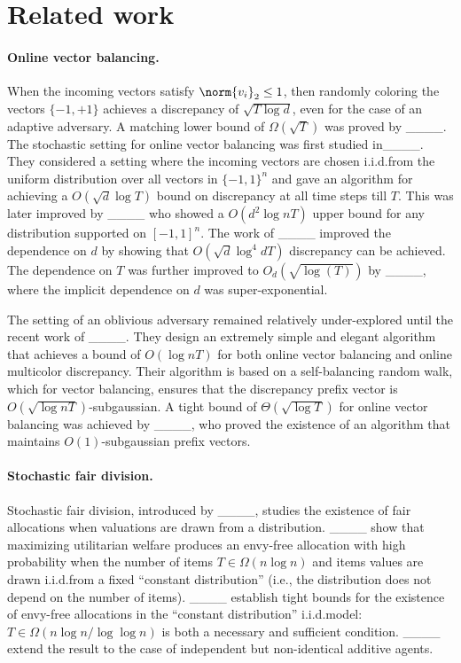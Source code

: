 \section{Related work}
\paragraph{Online vector balancing.}
    When the incoming vectors satisfy $\norm{v_i}_2 \leq 1$, then randomly coloring the vectors $\{-1,+1\}$ achieves a discrepancy of $\sqrt{T \log{d}}$, even for the case of an adaptive adversary. A  matching lower bound of $\Omega(\sqrt{T})$ was proved by ____. The stochastic setting for online vector balancing was first studied in____. They considered a setting where the incoming vectors are chosen i.i.d.\@ from the uniform distribution over all vectors in $\{-1,1\}^n$ and gave an algorithm for achieving a $O(\sqrt{d}\log{T})$ bound on discrepancy at all time steps till $T$. This was later improved by ____ who showed a $O(d^2 \log{nT})$ upper bound for any distribution supported on $[-1,1]^n$. The work of ____ improved the dependence on $d$ by showing that $O(\sqrt{d}\log^4{dT})$ discrepancy can be achieved. The dependence on $T$ was further improved to $O_d(\sqrt{\log(T)})$ by ____, where the implicit dependence on $d$ was super-exponential. 
    
    The setting of an oblivious adversary remained relatively under-explored until the recent work of ____. They design an extremely simple and elegant algorithm that achieves a bound of $O(\log{nT})$ for both online vector balancing and online multicolor discrepancy. Their algorithm is based on a self-balancing random walk, which for vector balancing, ensures that the discrepancy prefix vector is $O(\sqrt{\log{nT}})$-subgaussian. A tight bound of $\Theta(\sqrt{\log{T}})$ for online vector balancing was achieved by ____, who proved the existence of an algorithm that maintains $O(1)$-subgaussian prefix vectors.


\paragraph{Stochastic fair division.}

Stochastic fair division, introduced by ____, studies the existence of fair allocations when valuations are drawn from a distribution. ____ show that maximizing utilitarian welfare produces an envy-free allocation with high probability when the number of items $T \in \Omega(n \log n)$ and items values are drawn i.i.d.\@ from a fixed ``constant distribution'' (i.e., the distribution does not depend on the number of items). ____ establish tight bounds for the existence of envy-free allocations in the ``constant distribution'' i.i.d.\@ model: $T \in \Omega (n \log n / \log \log n )$ is both a necessary and sufficient condition. ____ extend the result to the case of independent but non-identical additive agents.

